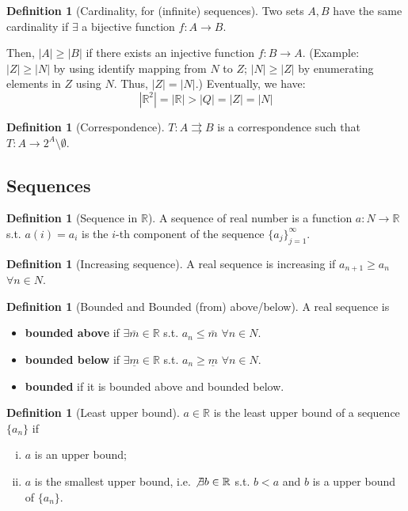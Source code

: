 \documentclass[12pt]{article}
\newcommand{\R}{{\mathbb R}}
\theoremstyle{definition}
\newtheorem{definition}[theorem]{Definition}
\theoremstyle{plain}
\begin{document}
\begin{definition}
    [Cardinality, for (infinite) sequences]
    Two sets $A, B$ have the same cardinality if $\exists$ a bijective function
    $f : A\to B$.

    Then, $|A|\ge |B|$ if there exists an injective function $f: B \to A$.
    (Example: $|Z|\ge |N|$ by using identify mapping from $N$ to $Z$; $|N|\ge
    |Z|$ by enumerating elements in $Z$ using $N$. Thus, $|Z| = |N|$.)
    Eventually, we have:
    \[
        |\R^2| = |\R| > |Q| = |Z| = |N|
    \]

\end{definition}

\begin{definition}
    [Correspondence]
    $T: A \rightrightarrows B$ is a correspondence such that $T: A \to 2^A
    \setminus \emptyset$.
\end{definition}

\subsection{Sequences}
\setcounter{theorem}{0}
\begin{definition}
    [Sequence in $\R$]
    A sequence of real number is a function $a : N \to \R$ s.t. $a(i) = a_i$ is
    the $i$-th component of the sequence $\{a_j\}_{j=1}^\infty$.
\end{definition}
\begin{definition}
    [Increasing sequence]
    A real sequence is increasing if $a_{n+1} \ge a_n$ $\forall n \in N$.
\end{definition}
\begin{definition}
    [Bounded and Bounded (from) above/below]
    A real sequence is

    \begin{itemize}
        \item \textbf{bounded above} if $\exists \bar m \in \R$ s.t. $a_n \le
            \bar m$ $\forall n \in N$.

        \item \textbf{bounded below} if $\exists \underline m \in \R$ s.t. $a_n
            \ge \underline m$ $\forall n \in N$.
        \item \textbf{bounded} if it is bounded above and bounded below.
    \end{itemize}
\end{definition}

\begin{definition}
    [Least upper bound]
    $a \in \R$ is the least upper bound of a sequence $\{a_n\}$ if
    \begin{enumerate}[(i)]
        \item $a$ is an upper bound;
        \item $a$ is the smallest upper bound, i.e. $\not \exists b \in \R$ s.t.
            $b < a$ and $b$ is a upper bound of $\{a_n\}$.
    \end{enumerate}
\end{definition}
\end{document}
